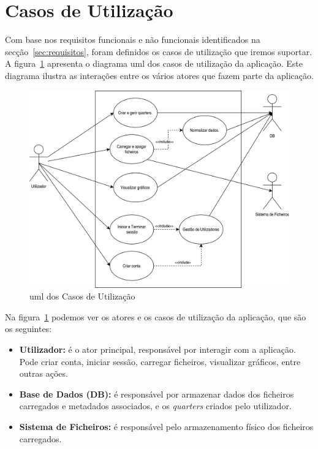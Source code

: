 \section{Casos de Utilização}
\label{ch:casosUtilizacao}

Com base nos requisitos funcionais e não funcionais identificados na secção~\ref{sec:requisitos}, foram definidos os casos de utilização que iremos suportar. A figura~\ref{fig:umlCasosUtilizacao} apresenta o diagrama \gls{uml} dos casos de utilização da aplicação. Este diagrama ilustra as interações entre os vários atores que fazem parte da aplicação.

\begin{figure}[h]
\centering
\includegraphics[max width=12cm]{./img/usecase_uml}
\caption{\gls{uml} dos Casos de Utilização}
\label{fig:umlCasosUtilizacao}
\end{figure}

Na figura~\ref{fig:umlCasosUtilizacao} podemos ver os atores e os casos de utilização da aplicação, que são os seguintes:
\begin{itemize}
    \item \textbf{Utilizador:} é o ator principal, responsável por interagir com a aplicação. Pode criar conta, iniciar sessão, carregar ficheiros, visualizar gráficos, entre outras ações.
    \item \textbf{Base de Dados (DB):} é responsável por armazenar dados dos ficheiros carregados e metadados associados, e os \textit{quarters} criados pelo utilizador.
    \item \textbf{Sistema de Ficheiros:} é responsável pelo armazenamento físico dos ficheiros carregados.
\end{itemize}


